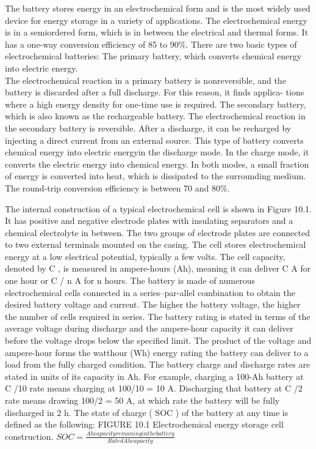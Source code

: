 \newpage

The battery stores energy in an electrochemical form and is the most widely used device for energy storage in a variety of applications. The electrochemical energy is in a semiordered form, which is in between the electrical and thermal forms. It has a one-way conversion efficiency of 85 to 90\%.
There are two basic types of electrochemical batteries:
The primary battery, which converts chemical energy into electric energy.\\
The electrochemical reaction in a primary battery is nonreversible, and the battery is discarded after a full discharge. For this reason, it finds applica- tions where a high energy density for one-time use is required.
The secondary battery, which is also known as the rechargeable battery.
The electrochemical reaction in the secondary battery is reversible. After a discharge, it can be recharged by injecting a direct current from an external source. This type of battery converts chemical energy into electric energyin the discharge mode. In the charge mode, it converts the electric energy into chemical energy. In both modes, a small fraction of energy is converted into heat, which is dissipated to the surrounding medium. The round-trip conversion efficiency is between 70 and 80\%.

The internal construction of a typical electrochemical cell is shown in Figure 10.1. It has positive and negative electrode plates with insulating separators and a chemical electrolyte in between. The two groups of electrode plates are connected to two external terminals mounted on the casing. The cell stores electrochemical energy at a low electrical potential, typically a few volts. The cell capacity, denoted by C , is measured in ampere-hours (Ah), meaning it can deliver C A for one hour or C / n A for n hours.
The battery is made of numerous electrochemical cells connected in a series–par-allel combination to obtain the desired battery voltage and current. The higher the battery voltage, the higher the number of cells required in series. The battery rating is stated in terms of the average voltage during discharge and the ampere-hour capacity it can deliver before the voltage drops below the specified limit. The product of the voltage and ampere-hour forms the watthour (Wh) energy rating the battery
can deliver to a load from the fully charged condition. The battery charge and discharge rates are stated in units of its capacity in Ah. For example, charging a 100-Ah battery at C
/10 rate means charging at 100/10 = 10 A. Discharging that
battery at C /2 rate means drawing 100/2 = 50 A, at which rate the battery will be fully discharged in 2 h. The state of charge ( SOC ) of the battery at any time is defined as the following:
FIGURE 10.1
Electrochemical energy storage cell construction.
$SOC = \frac{Ah capacity remaning in the battery}
{Rated Ah capacity}$





